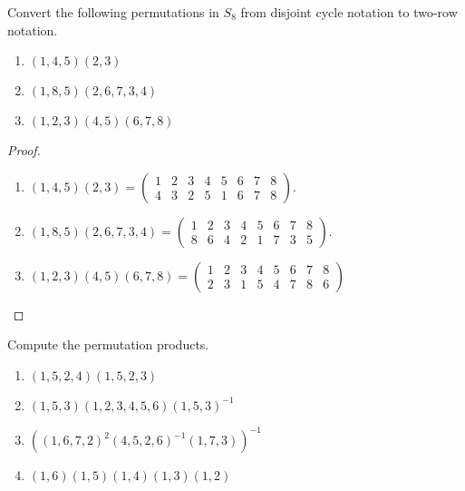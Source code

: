 \begin{exercise}
    Convert the following permutations in $S_{8}$ from disjoint cycle notation to two-row notation.
    \begin{enumerate}[label={\textbf{\arabic*.}}]
        \item $(1, 4, 5)(2, 3)$
        \item $(1, 8, 5)(2, 6, 7, 3, 4)$
        \item $(1, 2, 3)(4, 5)(6, 7, 8)$
    \end{enumerate}
\end{exercise}

\begin{proof}
    \begin{enumerate}[label={\textbf{\arabic*.}}]
        \item $(1, 4, 5)(2, 3) = \begin{pmatrix}
                      1 & 2 & 3 & 4 & 5 & 6 & 7 & 8 \\
                      4 & 3 & 2 & 5 & 1 & 6 & 7 & 8
                  \end{pmatrix}$.
        \item $(1, 8, 5)(2, 6, 7, 3, 4) = \begin{pmatrix}
                      1 & 2 & 3 & 4 & 5 & 6 & 7 & 8 \\
                      8 & 6 & 4 & 2 & 1 & 7 & 3 & 5
                  \end{pmatrix}$.
        \item $(1, 2, 3)(4, 5)(6, 7, 8) = \begin{pmatrix}
                      1 & 2 & 3 & 4 & 5 & 6 & 7 & 8 \\
                      2 & 3 & 1 & 5 & 4 & 7 & 8 & 6
                  \end{pmatrix}$
    \end{enumerate}
\end{proof}

\begin{exercise}
    Compute the permutation products.
    \begin{enumerate}[label={\textbf{\alph*.}}]
        \item $(1, 5, 2, 4)(1, 5, 2, 3)$
        \item $(1, 5, 3)(1, 2, 3, 4, 5, 6){(1, 5, 3)}^{-1}$
        \item ${({(1, 6, 7, 2)}^{2}{(4, 5, 2, 6)}^{-1}(1, 7, 3))}^{-1}$
        \item $(1, 6)(1, 5)(1, 4)(1, 3)(1, 2)$
    \end{enumerate}
\end{exercise}

